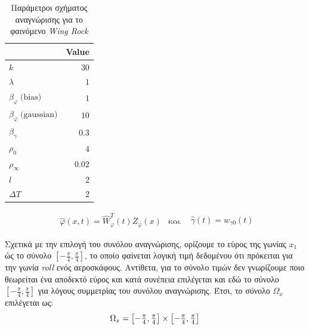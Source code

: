 	{\begin{table}
			\centering
			\captionsetup{format=plain}
			\caption{Παράμετροι σχήματος αναγνώρισης για το φαινόμενο \textit{Wing Rock}}
			\begin{tabular}{ l | r }
				\hline\hline
				\text{Parameter} & Value \\ \hline\hline
				$k$             & $30$   \\ \hline
				$\lambda$       & $1 $   \\ \hline
				$\beta_{\varphi} \;\text{(bias)}$     & $1$ \\ \hline
				$\beta_{\varphi} \;\text{(gaussian)}$ & $10$ \\ \hline
				$\beta_{\gamma}$ & $0.3$  \\ \hline
				$\rho_0      $ & $4$  \\ \hline
				$\rho_\infty $ & $0.02$  \\ \hline
				$l           $ & $2$  \\ \hline
				$\textit{ΔΤ} $  & $2$ 	\\ \hline \hline	
			\end{tabular}
			\label{tab:wing_rock_schema_params}
		\end{table}
	\begin{equation*}
	\begin{matrix}
	\hat{\varphi}(x,t)  = \hat{W}_{\varphi}^T(t) Z_\varphi(x) & \text{και} &  
	\end{matrix}\hat{\gamma}(t) = w_{\gamma 0}(t)
	\end{equation*}
	
	Σχετικά με την επιλογή του συνόλου αναγνώρισης, ορίζουμε το εύρος της γωνίας $x_1$ ώς το σύνολο $[-\frac{\pi}{4},\frac{\pi}{4}]$, το οποίο φαίνεται λογική τιμή δεδομένου ότι πρόκειται για την γωνία \textit{roll} ενός αεροσκάφους. Αντίθετα, για το σύνολο τιμών δεν γνωρίζουμε ποιο θεωρείται ένα αποδεκτό εύρος και κατά συνέπεια επιλέγεται και εδώ το σύνολο $[-\frac{\pi}{4},\frac{\pi}{4}]$ για λόγους συμμετρίας του συνόλου αναγνώρισης. Έτσι, το σύνολο $\Omega_x$ επιλέγεται ως:
	\begin{equation*}
	\Omega_x = \bmqty{-\frac{\pi}{4},\frac{\pi}{4}} \times \bmqty{-\frac{\pi}{4},\frac{\pi}{4}}
	\end{equation*}
	
	

}
